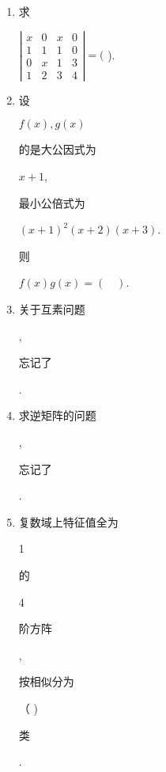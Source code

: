 \documentclass[10pt]{article}
\begin{document}
\begin{enumerate}
  \item \begin{CJK}{UTF8}{mj}求\end{CJK} $\left|\begin{array}{llll}x & 0 & x & 0 \\ 1 & 1 & 1 & 0 \\ 0 & x & 1 & 3 \\ 1 & 2 & 3 & 4\end{array}\right|=($ ).

  \item \begin{CJK}{UTF8}{mj}设\end{CJK} $f(x), g(x)$ \begin{CJK}{UTF8}{mj}的是大公因式为\end{CJK} $x+1$, \begin{CJK}{UTF8}{mj}最小公倍式为\end{CJK} $(x+1)^{2}(x+2)(x+3)$. \begin{CJK}{UTF8}{mj}则\end{CJK} $f(x) g(x)=(\quad)$.

  \item \begin{CJK}{UTF8}{mj}关于互素问题\end{CJK}, \begin{CJK}{UTF8}{mj}忘记了\end{CJK}.

  \item \begin{CJK}{UTF8}{mj}求逆矩阵的问题\end{CJK}, \begin{CJK}{UTF8}{mj}忘记了\end{CJK}.

  \item \begin{CJK}{UTF8}{mj}复数域上特征值全为\end{CJK} 1 \begin{CJK}{UTF8}{mj}的\end{CJK} 4 \begin{CJK}{UTF8}{mj}阶方阵\end{CJK}, \begin{CJK}{UTF8}{mj}按相似分为\end{CJK}（ ) \begin{CJK}{UTF8}{mj}类\end{CJK}.

\end{enumerate}
\end{document}
